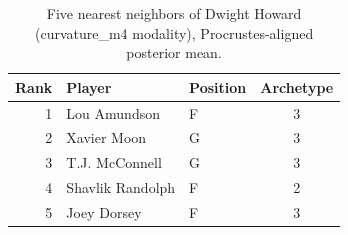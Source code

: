 \begin{table}[htbp]
  \centering\small
  \begin{tabular}{rllc}
    \toprule
    Rank & Player & Position & Archetype \\
    \midrule
    1 & Lou Amundson & F & 3 \\
    2 & Xavier Moon & G & 3 \\
    3 & T.J. McConnell & G & 3 \\
    4 & Shavlik Randolph & F & 2 \\
    5 & Joey Dorsey & F & 3 \\
    \bottomrule
  \end{tabular}
  \caption{Five nearest neighbors of Dwight Howard (curvature_m4 modality), Procrustes-aligned posterior mean.}
  \label{tab:Dwight_Howard_neighbors_curvature_m4}
\end{table}

